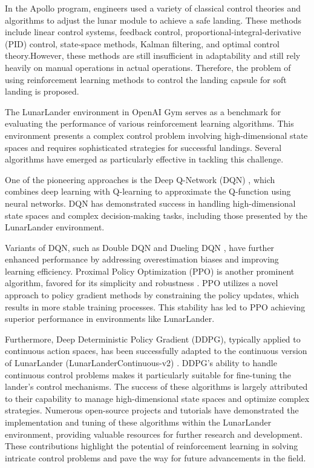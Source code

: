 \documentclass[conference]{IEEEtran}
\begin{document}
In the Apollo program, engineers used a variety of classical control theories and algorithms to adjust the lunar module to achieve a safe landing. These methods include linear control systems\cite{ogata2010modern}, feedback control\cite{franklin2015feedback}, proportional-integral-derivative (PID) control\cite{astrom2010feedback}, state-space methods\cite{kailath1980linear}, Kalman filtering\cite{kalman1960new}, and optimal control theory\cite{kirk2004optimal}.However, these methods are still insufficient in adaptability and still rely heavily on manual operations in actual operations. Therefore, the problem of using reinforcement learning methods to control the landing capsule for soft landing is proposed\cite{brockman2016openai}.

The LunarLander environment in OpenAI Gym serves as a benchmark for evaluating the performance of various reinforcement learning algorithms. This environment presents a complex control problem involving high-dimensional state spaces and requires sophisticated strategies for successful landings. Several algorithms have emerged as particularly effective in tackling this challenge. 

One of the pioneering approaches is the Deep Q-Network (DQN) \cite{mnih2015human}, which combines deep learning with Q-learning to approximate the Q-function using neural networks. DQN has demonstrated success in handling high-dimensional state spaces and complex decision-making tasks, including those presented by the LunarLander environment. 

Variants of DQN, such as Double DQN \cite{van2016deep} and Dueling DQN \cite{wang2016dueling}, have further enhanced performance by addressing overestimation biases and improving learning efficiency. Proximal Policy Optimization (PPO) is another prominent algorithm, favored for its simplicity and robustness \cite{schulman2017proximal}. PPO utilizes a novel approach to policy gradient methods by constraining the policy updates, which results in more stable training processes. This stability has led to PPO achieving superior performance in environments like LunarLander. 

Furthermore, Deep Deterministic Policy Gradient (DDPG), typically applied to continuous action spaces, has been successfully adapted to the continuous version of LunarLander (LunarLanderContinuous-v2) \cite{lillicrap2015continuous}. DDPG's ability to handle continuous control problems makes it particularly suitable for fine-tuning the lander's control mechanisms. The success of these algorithms is largely attributed to their capability to manage high-dimensional state spaces and optimize complex strategies. Numerous open-source projects and tutorials have demonstrated the implementation and tuning of these algorithms within the LunarLander environment, providing valuable resources for further research and development. These contributions highlight the potential of reinforcement learning in solving intricate control problems and pave the way for future advancements in the field.
\end{document}
